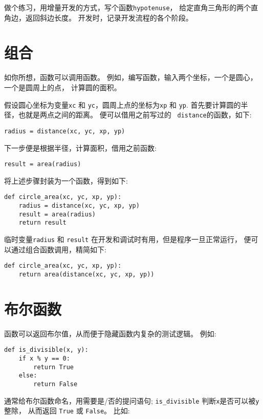 \documentclass[10pt]{book}
\begin{document}
做个练习，用增量开发的方式，写个函数{\tt hypotenuse}，
给定直角三角形的两个直角边，返回斜边长度。
开发时，记录开发流程的各个阶段。



\section{组合}

如你所想，函数可以调用函数。
例如，编写函数，输入两个坐标，一个是圆心，一个是圆周上的点，
计算圆的面积。

假设圆心坐标为变量{\tt xc} 和
{\tt yc}，圆周上点的坐标为{\tt xp} 和 {\tt yp}.
首先要计算圆的半径，也就是两点之间的距离。
便可以借用之前写过的 {\tt
distance}的函数，如下:

\begin{verbatim}
radius = distance(xc, yc, xp, yp)
\end{verbatim}
%
下一步便是根据半径，计算面积，借用之前函数:

\begin{verbatim}
result = area(radius)
\end{verbatim}
%
将上述步骤封装为一个函数，得到如下:

\begin{verbatim}
def circle_area(xc, yc, xp, yp):
    radius = distance(xc, yc, xp, yp)
    result = area(radius)
    return result
\end{verbatim}
%
临时变量{\tt radius} 和 {\tt result} 在开发和调试时有用，但是程序一旦正常运行，
便可以通过组合函数调用，精简如下:

\begin{verbatim}
def circle_area(xc, yc, xp, yp):
    return area(distance(xc, yc, xp, yp))
\end{verbatim}
%

\section{布尔函数}
\label{boolean}

函数可以返回布尔值，从而便于隐藏函数内复杂的测试逻辑。 
例如:

\begin{verbatim}
def is_divisible(x, y):
    if x % y == 0:
        return True
    else:
        return False
\end{verbatim}
%
通常给布尔函数命名，用需要是/否的提问语句; 
\verb"is_divisible" 判断{\tt x}是否可以被{\tt y}整除，
从而返回 {\tt True} 或 {\tt False}。
比如:
\end{document}

